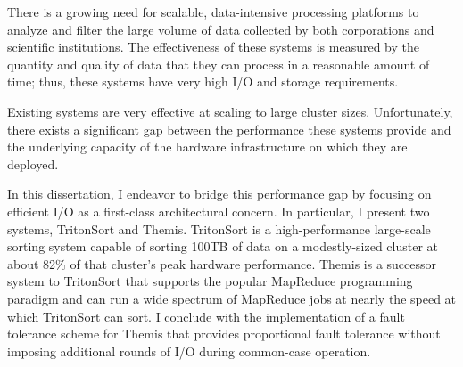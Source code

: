 \begin{dissertationabstract}
There is a growing need for scalable, data-intensive processing platforms to
analyze and filter the large volume of data collected by both corporations and
scientific institutions. The effectiveness of these systems is measured by the
quantity and quality of data that they can process in a reasonable amount of
time; thus, these systems have very high I/O and storage requirements.

Existing systems are very effective at scaling to large cluster
sizes. Unfortunately, there exists a significant gap between the performance
these systems provide and the underlying capacity of the hardware
infrastructure on which they are deployed.

In this dissertation, I endeavor to bridge this performance gap by focusing on
efficient I/O as a first-class architectural concern. In particular, I present
two systems, TritonSort and Themis. TritonSort is a high-performance
large-scale sorting system capable of sorting 100TB of data on a modestly-sized
cluster at about 82\% of that cluster's peak hardware performance. Themis is a
successor system to TritonSort that supports the popular MapReduce programming
paradigm and can run a wide spectrum of MapReduce jobs at nearly the speed at
which TritonSort can sort. I conclude with the implementation of a fault
tolerance scheme for Themis that provides proportional fault tolerance without
imposing additional rounds of I/O during common-case operation.
\end{dissertationabstract}
